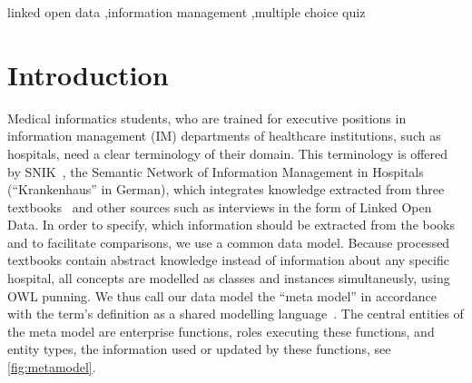 \documentclass{IOS-Book-Article}     %
\newcommand{\citep}{\cite}%
\begin{document}
\begin{frontmatter}

\begin{keyword}
linked open data \sep information management \sep multiple choice quiz
\end{keyword}
\end{frontmatter}
\section{Introduction}
Medical informatics students, who are trained for executive positions in information management (IM) departments of healthcare institutions, such as hospitals, need a clear terminology of their domain.
This terminology is offered by SNIK~\citep{semantischesnetz,sniktec}, the Semantic Network of Information Management in Hospitals (\enquote{Krankenhaus} in German), which integrates knowledge extracted from three textbooks~\citep{bb,ob,he} and other sources such as interviews in the form of Linked Open Data.
In order to specify, which information should be extracted from the books and to facilitate comparisons, we use a common data model.
Because processed textbooks contain abstract knowledge instead of information about any specific hospital, all concepts are modelled as classes and instances simultaneusly, using OWL punning.
We thus call our data model the \enquote{meta model} in accordance with the term's definition as a shared modelling language~\citep[p.~8]{ob}.
The central entities of the meta model are enterprise functions, roles executing these functions, and entity types, the information used or updated by these functions, see \cref{fig:metamodel}.
\end{document}
